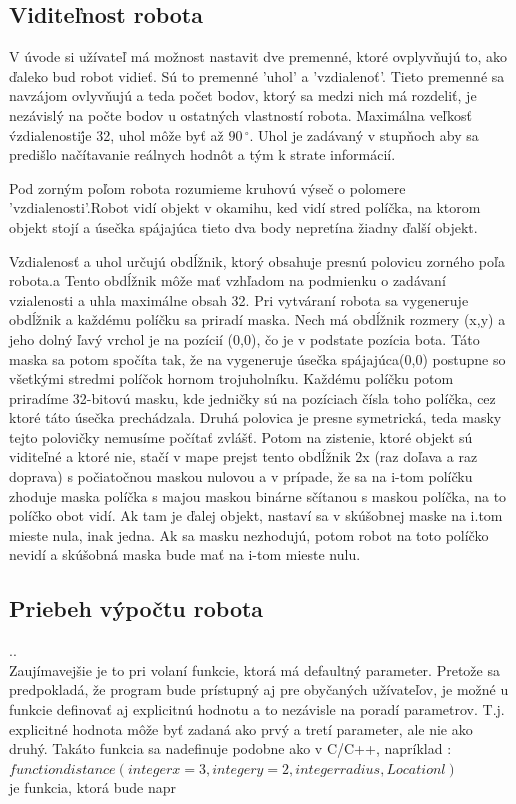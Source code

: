 \subsection{Viditeľnost robota}
V úvode si užívateľ má možnost nastavit dve premenné, ktoré ovplyvňujú to, ako ďaleko bud robot vidieť. Sú to premenné  'uhol' a 'vzdialenoť'. Tieto premenné sa navzájom ovlyvňujú a teda počet bodov, ktorý sa medzi nich má rozdeliť, je nezávislý na počte bodov u ostatných vlastností robota. Maximálna veľkosť \'vzdialenosti\' je 32, uhol môže byť až $90\,^{\circ}$. Uhol je zadávaný v stupňoch aby sa predišlo načítavanie reálnych hodnôt a tým k strate informácií.
\begin{definicia}
Pod zorným poľom robota rozumieme kruhovú výseč o polomere 'vzdialenosti'.Robot vidí objekt v okamihu, ked vidí stred políčka, na ktorom objekt stojí a úsečka spájajúca tieto dva body nepretína žiadny ďalší objekt.
\end{definicia}
Vzdialenosť a uhol určujú obdĺžnik, ktorý obsahuje presnú polovicu zorného poľa robota.a Tento obdĺžnik môže mať vzhľadom na podmienku o zadávaní vzialenosti a uhla maximálne obsah 32. Pri vytváraní robota sa vygeneruje obdĺžnik a každému políčku sa priradí maska. Nech má obdĺžnik rozmery (x,y) a jeho dolný ľavý vrchol je na pozícií (0,0), čo je v podstate pozícia bota. Táto maska sa potom spočíta tak, že na vygeneruje úsečka spájajúca(0,0) postupne so všetkými stredmi políčok hornom trojuholníku. Každému políčku potom priradíme 32-bitovú masku, kde jedničky sú na pozíciach čísla toho políčka, cez ktoré táto úsečka prechádzala. Druhá polovica je presne symetrická, teda masky tejto polovičky nemusíme počítať zvlášť. Potom na zistenie, ktoré objekt sú viditeľné a ktoré nie, stačí v mape prejst tento obdĺžnik 2x (raz doľava a raz doprava) s počiatočnou maskou nulovou a v prípade, že sa na i-tom políčku zhoduje maska políčka s majou maskou binárne sčítanou s maskou políčka, na to políčko obot vidí. Ak tam je ďalej objekt, nastaví sa v skúšobnej maske na i.tom mieste nula, inak jedna. Ak sa masku nezhodujú, potom robot na toto políčko nevidí a skúšobná maska bude mať na i-tom mieste nulu.
\indent
\subsection{Priebeh výpočtu robota} %
..\\
Zaujímavejšie je to pri volaní funkcie, ktorá má defaultný parameter. Pretože sa predpokladá, že program bude prístupný aj pre obyčaných užívateľov, je možné u funkcie definovať aj explicitnú hodnotu a to nezávisle na poradí parametrov. T.j. explicitné hodnota môže byť zadaná ako prvý a tretí parameter, ale nie ako druhý. Takáto funkcia sa nadefinuje podobne ako v C/C++, napríklad : \\\center $ function distance(integer x=3, integer y=2, integer radius, Location l) $ \\ je funkcia, ktorá bude napr
